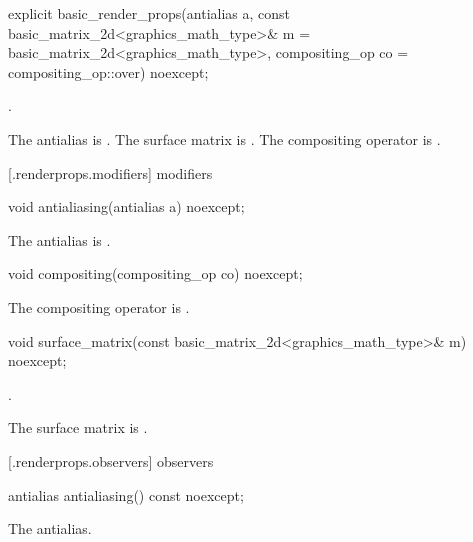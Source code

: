 %
\begin{itemdecl}
explicit basic_render_props(antialias a,
  const basic_matrix_2d<graphics_math_type>& m = basic_matrix_2d<graphics_math_type>{},
  compositing_op co = compositing_op::over) noexcept;
\end{itemdecl}
\begin{itemdescr}
\pnum
\requires
{}.

\pnum
\effects
The antialias is . The surface matrix is . The compositing operator is .
\end{itemdescr}

 [\iotwod.renderprops.modifiers] { modifiers}

%
\begin{itemdecl}
void antialiasing(antialias a) noexcept;
\end{itemdecl}
\begin{itemdescr}
\pnum
\effects
The antialias is .
\end{itemdescr}

%
\begin{itemdecl}
void compositing(compositing_op co) noexcept;
\end{itemdecl}
\begin{itemdescr}
\pnum
\effects
The compositing operator is .
\end{itemdescr}

%
\begin{itemdecl}
void surface_matrix(const basic_matrix_2d<graphics_math_type>& m) noexcept;
\end{itemdecl}
\begin{itemdescr}
\pnum
\requires
{}.

\pnum
\effects
The surface matrix is .
\end{itemdescr}

 [\iotwod.renderprops.observers] { observers}

%
\begin{itemdecl}
antialias antialiasing() const noexcept;
\end{itemdecl}
\begin{itemdescr}
\pnum
\returns
The antialias.
\end{itemdescr}

